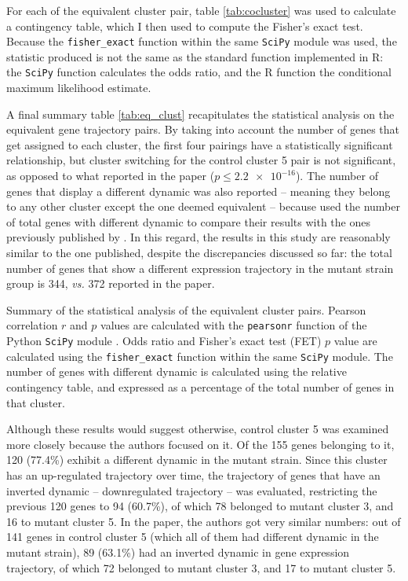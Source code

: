 For each of the equivalent cluster pair, table \ref{tab:cocluster} was used to calculate a contingency table, which I then used to compute the Fisher's exact test. Because the \texttt{fisher\_exact} function within the same \texttt{SciPy} module was used, the statistic produced is not the same as the standard function implemented in R: the \texttt{SciPy} function calculates the odds ratio, and the R function the conditional maximum likelihood estimate.

A final summary table \ref{tab:eq_clust} recapitulates the statistical analysis on the equivalent gene trajectory pairs. By taking into account the number of genes that get assigned to each cluster, the first four pairings have a statistically significant relationship, but cluster switching for the control cluster 5 pair is not significant, as opposed to what reported in the paper ($p \leq \num{2.2e-16}$). The number of genes that display a different dynamic was also reported -- meaning they belong to any other cluster except the one deemed equivalent -- because \citeauthor{mcdowellClusteringGeneExpression2018} used the number of total genes with different dynamic to compare their results with the ones previously published by \citeauthor{sharmaRosRTranscriptionFactor2012}. In this regard, the results in this study are reasonably similar to the one published, despite the discrepancies discussed so far: the total number of genes that show a different expression trajectory in the mutant strain group is 344, \textit{vs.} 372 reported in the paper.

\begin{table}[!ht]
    \centering\footnotesize
    
    \caption[Equivalent cluster summary]{Summary of the statistical analysis of the equivalent cluster pairs. Pearson correlation $r$ and $p$ values are calculated with the \texttt{pearsonr} function of the Python \texttt{SciPy} module \citep{virtanenSciPyFundamentalAlgorithms2020}. Odds ratio and Fisher's exact test (FET) $p$ value are calculated using the \texttt{fisher\_exact} function within the same \texttt{SciPy} module. The number of genes with different dynamic is calculated using the relative contingency table, and expressed as a percentage of the total number of genes in that cluster.}\label{tab:eq_clust}
\end{table}

Although these results would suggest otherwise, control cluster 5 was examined more closely because the authors focused on it. Of the 155 genes belonging to it, 120 (77.4\%) exhibit a different dynamic in the mutant strain. Since this cluster has an up-regulated trajectory over time, the trajectory of genes that have an inverted dynamic -- downregulated trajectory -- was evaluated, restricting the previous 120 genes to 94 (60.7\%), of which 78 belonged to mutant cluster 3, and 16 to mutant cluster 5.
In the paper, the authors got very similar numbers: out of 141 genes in control cluster 5 (which all of them had different dynamic in the mutant strain), 89 (63.1\%) had an inverted dynamic in gene expression trajectory, of which 72 belonged to mutant cluster 3, and 17 to mutant cluster 5.

